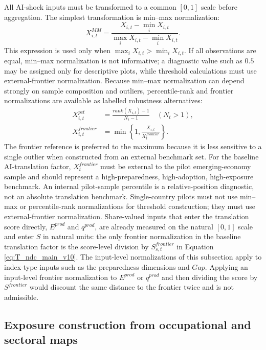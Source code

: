 \documentclass[11pt,a4paper]{article}
\begin{document}
All AI-shock inputs must be transformed to a common $[0,1]$ scale before aggregation. The simplest transformation is min--max normalization:
\begin{equation}
    X^{MM}_{i,t}=\frac{X_{i,t}-\min_i X_{i,t}}{\max_i X_{i,t}-\min_i X_{i,t}}.
\end{equation}
This expression is used only when $\max_iX_{i,t}>\min_iX_{i,t}$. If all observations are equal, min--max normalization is not informative; a diagnostic value such as $0.5$ may be assigned only for descriptive plots, while threshold calculations must use external-frontier normalization. Because min--max normalization can depend strongly on sample composition and outliers, percentile-rank and frontier normalizations are available as labelled robustness alternatives:
\begin{align}
    X^{pct}_{i,t}&=\frac{rank(X_{i,t})-1}{N_t-1}\quad (N_t>1),\\
    X^{frontier}_{i,t}&=\min\left\{1,\frac{X_{i,t}}{X^{frontier}_t}\right\}.
\end{align}
The frontier reference is preferred to the maximum because it is less sensitive to a single outlier when constructed from an external benchmark set. For the baseline AI-translation factor, $X^{frontier}_t$ must be external to the pilot emerging-economy sample and should represent a high-preparedness, high-adoption, high-exposure benchmark. An internal pilot-sample percentile is a relative-position diagnostic, not an absolute translation benchmark. Single-country pilots must not use min--max or percentile-rank normalizations for threshold construction; they must use external-frontier normalization. Share-valued inputs that enter the translation score directly, $E^{prod}$ and $q^{prod}$, are already measured on the natural $[0,1]$ scale and enter $S$ in natural units: the only frontier normalization in the baseline translation factor is the score-level division by $S^{frontier}_{s,t}$ in Equation \eqref{eq:T_ndc_main_v10}. The input-level normalizations of this subsection apply to index-type inputs such as the preparedness dimensions and $Gap$. Applying an input-level frontier normalization to $E^{prod}$ or $q^{prod}$ and then dividing the score by $S^{frontier}$ would discount the same distance to the frontier twice and is not admissible.

\subsection{Exposure construction from occupational and sectoral maps}
\end{document}
